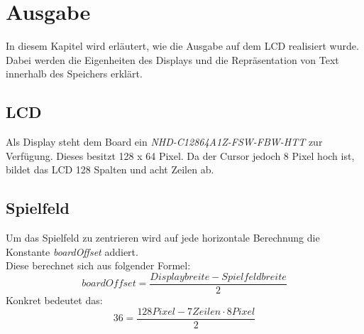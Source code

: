 \newpage
\section{Ausgabe}
    In diesem Kapitel wird erläutert, wie die Ausgabe auf dem LCD realisiert wurde.
    Dabei werden die Eigenheiten des Displays und die Repräsentation von Text innerhalb des Speichers erklärt.

    \subsection{LCD}
        Als Display steht dem Board ein \textit{NHD-C12864A1Z-FSW-FBW-HTT} zur Verfügung.
        Dieses besitzt 128 x 64 Pixel. Da der Cursor jedoch 8 Pixel hoch ist,
        bildet das LCD 128 Spalten und acht Zeilen ab.

    \subsection{Spielfeld}
        Um das Spielfeld zu zentrieren wird auf jede horizontale Berechnung die Konstante 
        \textit{boardOffset} addiert.\\
        Diese berechnet sich aus folgender Formel:
        \begin{equation}
            boardOffset = \dfrac{Displaybreite - Spielfeldbreite}{2}
        \end{equation}
        Konkret bedeutet das:
        \begin{equation}
            36 = \dfrac{128 Pixel - 7 Zeilen \cdot 8 Pixel}{2}
        \end{equation}
        

